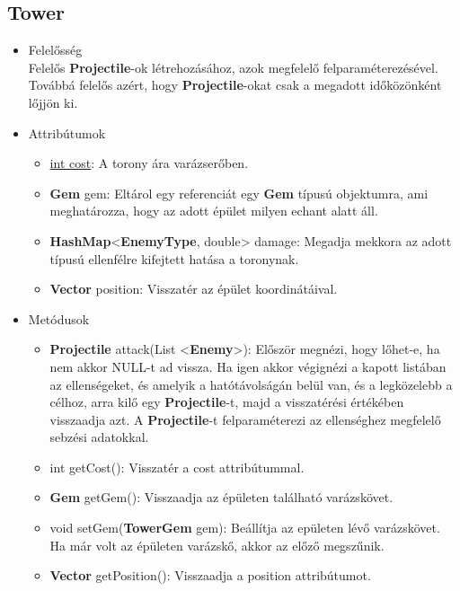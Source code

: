 \subsection{Tower}
\begin{itemize}
\item Felelősség\\
Felelős \textbf{Projectile}-ok létrehozásához, azok megfelelő felparaméterezésével. Továbbá felelős azért, hogy \textbf{Projectile}-okat csak a megadott időközönként lőjjön ki.
\item Attribútumok
	\begin{itemize}
		\item \underline{int cost}: A torony ára varázserőben.
		\item \textbf{Gem} gem: Eltárol egy referenciát egy \textbf{Gem} típusú objektumra, ami meghatározza, hogy az adott épület milyen echant alatt áll.
		\item \textbf{HashMap}<\textbf{EnemyType}, double> damage: Megadja mekkora az adott típusú ellenfélre kifejtett hatása a toronynak.
		\item \textbf{Vector} position: Visszatér az épület koordinátáival.
	\end{itemize}
\item Metódusok
	\begin{itemize}
		\item \textbf{Projectile} attack(List <\textbf{Enemy}>): Először megnézi, hogy lőhet-e, ha nem akkor NULL-t ad vissza. Ha igen akkor végignézi a kapott listában az ellenségeket, és amelyik a hatótávolságán belül van, és a legközelebb a célhoz, arra kilő egy \textbf{Projectile}-t, majd a visszatérési értékében visszaadja azt. A \textbf{Projectile}-t felparaméterezi az ellenséghez megfelelő sebzési adatokkal.
		\item int getCost(): Visszatér a cost attribútummal.
		\item \textbf{Gem} getGem(): Visszaadja az épületen található varázskövet.
		\item void setGem(\textbf{TowerGem} gem): Beállítja az epületen lévő varázskövet. Ha már volt az épületen varázskő, akkor az előző megszűnik.
		\item \textbf{Vector} getPosition(): Visszaadja a position attribútumot.
	\end{itemize}
\end{itemize}


